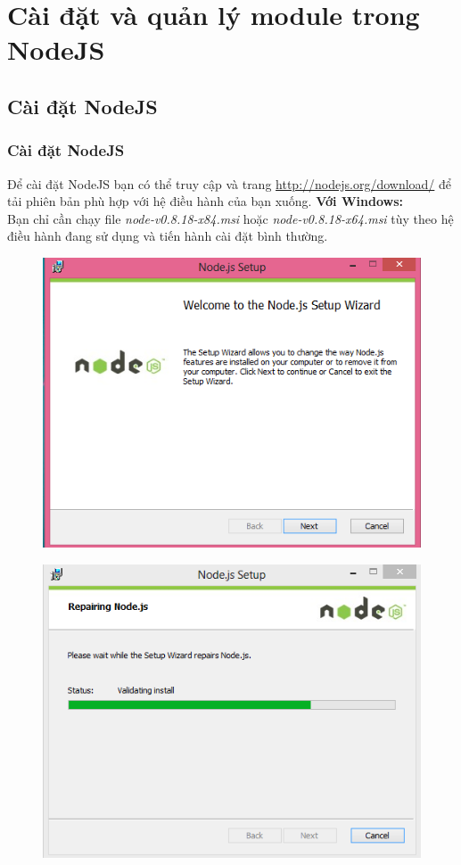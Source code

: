 ﻿\chapter{Cài đặt và quản lý module trong NodeJS}
\section{Cài đặt NodeJS}
	\subsection{Cài đặt NodeJS}
   Để cài đặt NodeJS bạn có thể truy cập và trang \url{http://nodejs.org/download/} để tải phiên bản phù hợp với hệ điều hành của bạn xuống.
      \textbf{Với Windows:} \\
		Bạn chỉ cần chạy file \textit{node-v0.8.18-x84.msi} hoặc \textit{node-v0.8.18-x64.msi} tùy theo hệ điều hành đang sử dụng và tiến hành cài đặt bình thường.

	\begin{figure}[-h]
		\centering
		\includegraphics[scale=0.7]{2_1}
	\end{figure}
	
	\begin{figure}[-h]
		\centering
		\includegraphics[scale=0.7]{2_2}
	\end{figure}

